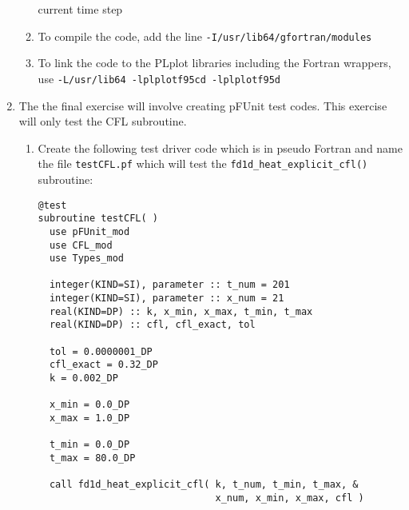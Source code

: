 \documentclass[12pt]{article}
\begin{document}
\begin{enumerate}
\begin{enumerate}
current time step
\item To compile the code, add the line \texttt{-I/usr/lib64/gfortran/modules}
\item To link the code to the PLplot libraries including the Fortran wrappers, use \newline
\texttt{-L/usr/lib64 -lplplotf95cd -lplplotf95d}
\end{enumerate}
\item The the final exercise will involve creating pFUnit test codes. This exercise will only
test the CFL subroutine. 
\begin{enumerate}
\item Create the following test driver code which is in pseudo Fortran and name the file \texttt{testCFL.pf} 
which will test the \texttt{fd1d\_heat\_explicit\_cfl()} subroutine:
\begin{verbatim}
@test
subroutine testCFL( )
  use pFUnit_mod
  use CFL_mod
  use Types_mod

  integer(KIND=SI), parameter :: t_num = 201
  integer(KIND=SI), parameter :: x_num = 21
  real(KIND=DP) :: k, x_min, x_max, t_min, t_max 
  real(KIND=DP) :: cfl, cfl_exact, tol

  tol = 0.0000001_DP
  cfl_exact = 0.32_DP
  k = 0.002_DP

  x_min = 0.0_DP
  x_max = 1.0_DP

  t_min = 0.0_DP
  t_max = 80.0_DP
  
  call fd1d_heat_explicit_cfl( k, t_num, t_min, t_max, &
                               x_num, x_min, x_max, cfl )


\end{verbatim}
\end{enumerate}
\end{enumerate}
\end{document}
